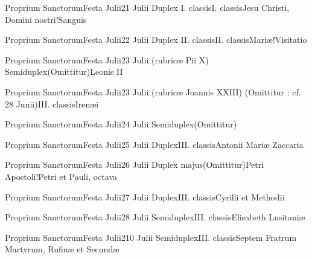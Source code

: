 \documentclass[invitatoriale-romanum.tex]{subfiles}
\begin{document}

	{Proprium Sanctorum}{Festa Julii}{2}{1 Julii}
	{Duplex I. classis}{I. classis}{Jesu Christi, Domini nostri!Sanguis}
	{}
	{}

	{Proprium Sanctorum}{Festa Julii}{2}{2 Julii}
	{Duplex II. classis}{II. classis}{Mariæ!Visitatio}
	{}
	{}

	{Proprium Sanctorum}{Festa Julii}{2}{3 Julii (rubricæ Pii X)}
	{Semiduplex}{(Omittitur)}{Leonis II}
	{}
	{}

	{Proprium Sanctorum}{Festa Julii}{2}{3 Julii (rubricæ Joannis XXIII)}
	{(Omittitur : cf. 28 Junii)}{III. classis}{Irenæi}
	{}
	{}

	{Proprium Sanctorum}{Festa Julii}{2}{4 Julii}
	{Semiduplex}{(Omittitur)}{}
	{}
	{\invitferia}

	{Proprium Sanctorum}{Festa Julii}{2}{5 Julii}
	{Duplex}{III. classis}{Antonii Mariæ Zaccaria}
	{}
	{}

	{Proprium Sanctorum}{Festa Julii}{2}{6 Julii}
	{Duplex majus}{(Omittitur)}{Petri Apostoli!Petri et Pauli, octava}
	{}
	{\invitferia}

	{Proprium Sanctorum}{Festa Julii}{2}{7 Julii}
	{Duplex}{III. classis}{Cyrilli et Methodii}
	{}
	{}

	{Proprium Sanctorum}{Festa Julii}{2}{8 Julii}
	{Semiduplex}{III. classis}{Elisabeth Lusitaniæ}
	{}
	{}

	{Proprium Sanctorum}{Festa Julii}{2}{10 Julii}
	{Semiduplex}{III. classis}{Septem Fratrum Martyrum, Rufinæ et Secundæ}
	{}
	{}
\end{document}
